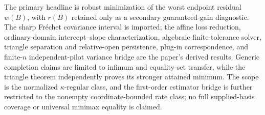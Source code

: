 The primary headline is robust minimization of the worst endpoint residual \(w(B)\), with \(r(B)\) retained only as a secondary guaranteed-gain diagnostic.  The sharp Fr\'echet covariance interval is imported; the affine loss reduction, ordinary-domain intercept--slope characterization, algebraic finite-tolerance solver, triangle separation and relative-open persistence, plug-in correspondence, and finite-\(n\) independent-pilot variance bridge are the paper's derived results.  Generic completion claims are limited to infimum and equality-set transfer, while the triangle theorem independently proves its stronger attained minimum.  The scope is the normalized \(\kappa\)-regular class, and the first-order estimator bridge is further restricted to the nonempty coordinate-bounded rate class; no full supplied-basis coverage or universal minimax equality is claimed.